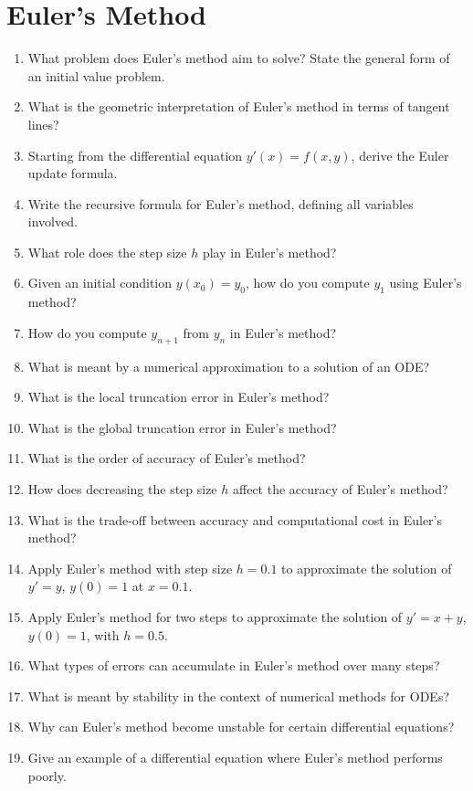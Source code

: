\section{Euler's Method}

\begin{enumerate}
  \item What problem does Euler's method aim to solve? State the general form of an initial value problem.
  \item What is the geometric interpretation of Euler's method in terms of tangent lines?
  \item Starting from the differential equation $y'(x) = f(x,y)$, derive the Euler update formula.
  \item Write the recursive formula for Euler's method, defining all variables involved.
  \item What role does the step size $h$ play in Euler's method?
  \item Given an initial condition $y(x_0) = y_0$, how do you compute $y_1$ using Euler's method?
  \item How do you compute $y_{n+1}$ from $y_n$ in Euler's method?
  \item What is meant by a numerical approximation to a solution of an ODE?
  \item What is the local truncation error in Euler's method?
  \item What is the global truncation error in Euler's method?
  \item What is the order of accuracy of Euler's method?
  \item How does decreasing the step size $h$ affect the accuracy of Euler's method?
  \item What is the trade-off between accuracy and computational cost in Euler's method?
  \item Apply Euler's method with step size $h = 0.1$ to approximate the solution of $y' = y$, $y(0) = 1$ at $x = 0.1$.
  \item Apply Euler's method for two steps to approximate the solution of $y' = x + y$, $y(0) = 1$, with $h = 0.5$.
  \item What types of errors can accumulate in Euler's method over many steps?
  \item What is meant by stability in the context of numerical methods for ODEs?
  \item Why can Euler's method become unstable for certain differential equations?
  \item Give an example of a differential equation where Euler's method performs poorly.

\end{enumerate}
